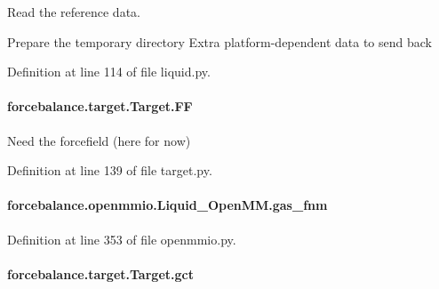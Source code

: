 Read the reference data. 

Prepare the temporary directory Extra platform-\/dependent data to send back 

Definition at line 114 of file liquid.\-py.

\hypertarget{classforcebalance_1_1target_1_1Target_a38a37919783141ea37fdcf8b00ce0aaf}{
\paragraph[{F\-F}]{\setlength{\rightskip}{0pt plus 5cm}forcebalance.\-target.\-Target.\-F\-F\hspace{0.3cm}{\ttfamily [inherited]}}}\label{classforcebalance_1_1target_1_1Target_a38a37919783141ea37fdcf8b00ce0aaf}


Need the forcefield (here for now) 



Definition at line 139 of file target.\-py.

\hypertarget{classforcebalance_1_1openmmio_1_1Liquid__OpenMM_a7b835f5dbacf1c31ead8c0c47e6895ce}{
\paragraph[{gas\-\_\-fnm}]{\setlength{\rightskip}{0pt plus 5cm}forcebalance.\-openmmio.\-Liquid\-\_\-\-Open\-M\-M.\-gas\-\_\-fnm}}\label{classforcebalance_1_1openmmio_1_1Liquid__OpenMM_a7b835f5dbacf1c31ead8c0c47e6895ce}


Definition at line 353 of file openmmio.\-py.

\hypertarget{classforcebalance_1_1target_1_1Target_aa625ac88c6744eb14ef281d9496d0dbb}{
\paragraph[{gct}]{\setlength{\rightskip}{0pt plus 5cm}forcebalance.\-target.\-Target.\-gct\hspace{0.3cm}{\ttfamily [inherited]}}}\label{classforcebalance_1_1target_1_1Target_aa625ac88c6744eb14ef281d9496d0dbb}


